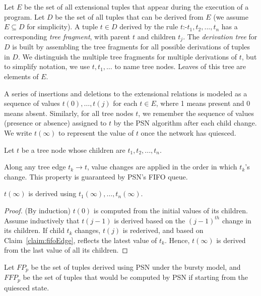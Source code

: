 Let $E$ be the set of all extensional tuples that appear during the
execution of a program. Let $D$ be the set of all tuples that can be
derived from $E$ (we assume $E \subseteq D$ for simplicity).  A tuple $t
\in D$ derived by the rule $t \mbox{:-} t_{1}, t_{2}, ..., t_n$ has a
corresponding {\em tree fragment}, with parent $t$ and children
$t_{j}$. The \emph{derivation tree} for $D$ is built by assembling the tree
fragments for all possible derivations of tuples in $D$. We distinguish the
multiple tree fragments for multiple derivations of $t$, but to simplify
notation, we use $t, t_1, \ldots$ to name tree nodes. Leaves of this tree
are elements of $E$.

A series of insertions and deletions to the extensional relations is
modeled as a sequence of values $t(0), \ldots, t(j)$ for each $t \in E$,
where 1 means present and 0 means absent. Similarly, for all tree nodes $t$, we
remember the sequence of values (presence or absence) assigned to $t$ by
the PSN algorithm after each child change.  We write $t(\infty)$ to represent
the value of $t$ once the network has quiesced.

Let $t$ be a tree node whose children are $t_{1},t_{2},...,t_{n}$.

\begin{Claim} \label{claim:fifoEdge} 
Along any tree edge $t_{k} \rightarrow t$, value changes are applied in
the order in which $t_{k}$'s change. This property is guaranteed by PSN's
FIFO queue.
\end{Claim}

\begin{Lem} \label{lem:fifoEdge}
$t(\infty)$ is derived using $t_{1}(\infty), \ldots, t_n(\infty)$.
\end{Lem}
\begin{proof} 
(By induction) $t(0)$ is computed from the initial values of its
children. Assume inductively that $t(j-1)$ is derived based on the
$(j-1)^{th}$ change in its children. If child $t_{k}$ changes, $t(j)$ is
rederived, and based on Claim~\ref{claim:fifoEdge}, reflects the latest
value of $t_{k}$. Hence, $t(\infty)$ is derived from the last value of all
its children.
\end{proof} 

Let $FP_{p}$ be the set of tuples derived using PSN under the bursty model,
and $FFP_{p}$ be the set of tuples that would be computed by PSN if
starting from the quiesced state.

